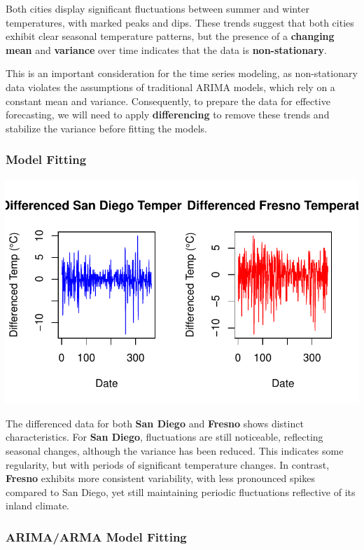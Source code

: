 \documentclass[
  11pt,
]{article}
\begin{document}
Both cities display significant fluctuations between summer and winter
temperatures, with marked peaks and dips. These trends suggest that both
cities exhibit clear seasonal temperature patterns, but the presence of
a \textbf{changing mean} and \textbf{variance} over time indicates that
the data is \textbf{non-stationary}.

This is an important consideration for the time series modeling, as
non-stationary data violates the assumptions of traditional ARIMA
models, which rely on a constant mean and variance. Consequently, to
prepare the data for effective forecasting, we will need to apply
\textbf{differencing} to remove these trends and stabilize the variance
before fitting the models.

\subsubsection{Model Fitting}\label{model-fitting}

\includegraphics{project_files/figure-pdf/unnamed-chunk-85-1.pdf}

The differenced data for both \textbf{San Diego} and \textbf{Fresno}
shows distinct characteristics. For \textbf{San Diego}, fluctuations are
still noticeable, reflecting seasonal changes, although the variance has
been reduced. This indicates some regularity, but with periods of
significant temperature changes. In contrast, \textbf{Fresno} exhibits
more consistent variability, with less pronounced spikes compared to San
Diego, yet still maintaining periodic fluctuations reflective of its
inland climate.

\subsubsection{ARIMA/ARMA Model Fitting}\label{arimaarma-model-fitting}
\end{document}
